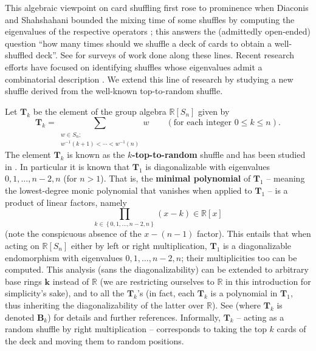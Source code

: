 \documentclass[12pt]{article}
\theoremstyle{definition}%
\theoremstyle{definition}%
\theoremstyle{remark}%
\newcommand{\tup}[1]{\left( #1 \right)}
\newcommand{\set}[1]{\left\{ #1 \right\}}
\newcommand{\cyc}[1]{\operatorname{cyc}_{#1}}
\newcommand{\RR}{\mathbb{R}}
\newcommand{\kk}{\mathbf{k}}
\newcommand{\BB}{\mathbf{B}}
\newcommand{\TT}{\mathbf{T}}
\newcommand{\defin}[1]{\textbf{#1}}
\begin{document}



This algebraic viewpoint on card shuffling first rose to prominence when Diaconis and Shahshahani bounded the mixing time of some shuffles by computing the eigenvalues of the respective operators \cite{DiaSha81}; this answers the (admittedly open-ended) question ``how many times should we shuffle a deck of cards to obtain a well-shuffled deck''.
See \cite{DiaconisFulman,Diaconis03} for surveys of work done along these lines.
Recent research efforts have focused on identifying shuffles whose eigenvalues admit a combinatorial description \cite{GriLaf22, DiaSha81, Phatar91, DieSal18}.
We extend this line of research by studying a new shuffle derived from the well-known top-to-random shuffle.

Let $\TT_k$ be the element of the group algebra $\RR[S_n]$ given by
\[
\TT_k = \sum_{\substack{w \in S_n;\\ w^{-1}\tup{ k+1 } < \cdots < w^{-1}\tup{ n }}} w \qquad\tup{ \text{for each integer } 0 \leq k \leq n}.
\]
The element $ \TT_k $ is known as the \defin{$k$-top-to-random} shuffle and has been studied in \cite{Phatar91}.
In particular it is known that $\TT_1$ is diagonalizable with eigenvalues $0, 1, \ldots, n-2, n$ (for $n>1$).
That is, the \defin{minimal polynomial} of $\TT_1$ -- meaning the lowest-degree monic polynomial that vanishes when applied to $\TT_1$ -- is a product of linear factors, namely
\[
\prod_{k \in \set{0, 1, \ldots, n-2, n}} \tup{x-k} \in \RR[x]
\]
(note the conspicuous absence of the $x-\tup{n-1}$ factor).
This entails that when acting on $\RR[S_n]$ either by left or right multiplication, $\TT_1$ is a diagonalizable endomorphism with eigenvalues $0, 1, \ldots, n-2, n$; their multiplicities too can be computed.
This analysis (sans the diagonalizability) can be extended to arbitrary base rings $\kk$ instead of $\RR$ (we are restricting ourselves to $\RR$ in this introduction for simplicity's sake),
and to all the $\TT_k$'s (in fact, each $\TT_k$ is a polynomial in $\TT_1$, thus inheriting the diagonalizability of the latter over $\RR$).
See \cite{MO308600} (where $\TT_k$ is denoted $\BB_k$) for details and further references.
Informally, $\TT_k$ -- acting as a random shuffle by right multiplication -- corresponds to taking the top $k$ cards of the deck and moving them to random positions.
\end{document}
